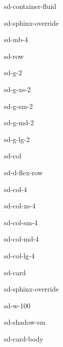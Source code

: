 \documentclass[letterpaper,10pt,italian]{jupyterBook}
\begin{document}
\begin{sphinxuseclass}{sd-container-fluid}
\begin{sphinxuseclass}{sd-sphinx-override}
\begin{sphinxuseclass}{sd-mb-4}
\begin{sphinxuseclass}{sd-row}
\begin{sphinxuseclass}{sd-g-2}
\begin{sphinxuseclass}{sd-g-xs-2}
\begin{sphinxuseclass}{sd-g-sm-2}
\begin{sphinxuseclass}{sd-g-md-2}
\begin{sphinxuseclass}{sd-g-lg-2}
\begin{sphinxuseclass}{sd-col}
\begin{sphinxuseclass}{sd-d-flex-row}
\begin{sphinxuseclass}{sd-col-4}
\begin{sphinxuseclass}{sd-col-xs-4}
\begin{sphinxuseclass}{sd-col-sm-4}
\begin{sphinxuseclass}{sd-col-md-4}
\begin{sphinxuseclass}{sd-col-lg-4}
\begin{sphinxuseclass}{sd-card}
\begin{sphinxuseclass}{sd-sphinx-override}
\begin{sphinxuseclass}{sd-w-100}
\begin{sphinxuseclass}{sd-shadow-sm}
\begin{sphinxuseclass}{sd-card-body}
\end{sphinxuseclass}
\end{sphinxuseclass}
\end{sphinxuseclass}
\end{sphinxuseclass}
\end{sphinxuseclass}
\end{sphinxuseclass}
\end{sphinxuseclass}
\end{sphinxuseclass}
\end{sphinxuseclass}
\end{sphinxuseclass}
\end{sphinxuseclass}
\end{sphinxuseclass}
\end{sphinxuseclass}
\end{sphinxuseclass}
\end{sphinxuseclass}
\end{sphinxuseclass}
\end{sphinxuseclass}
\end{sphinxuseclass}
\end{sphinxuseclass}
\end{sphinxuseclass}
\end{sphinxuseclass}
\end{document}
